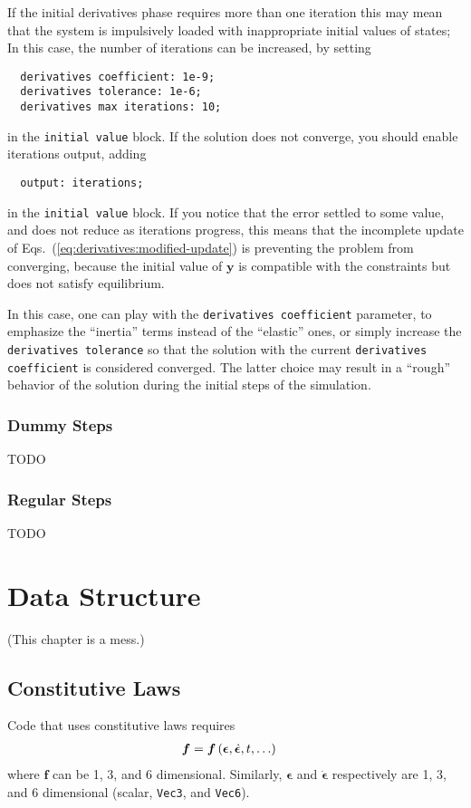 \documentclass[10pt,fleqn,subeqn]{report}
\newcommand{\T}[1]{\bm{#1}}
\begin{document}
If the initial derivatives phase requires
more than one iteration  
this may mean that
the system is impulsively loaded  with inappropriate 
initial values of states; 
In this case, the number of iterations can be increased,
by setting
\begin{verbatim}
  derivatives coefficient: 1e-9;
  derivatives tolerance: 1e-6;
  derivatives max iterations: 10; 
\end{verbatim}
in the \texttt{initial value} block.
If the solution does not converge, you should enable iterations output,
adding
\begin{verbatim}
  output: iterations;
\end{verbatim}
in the \texttt{initial value} block.
If you notice that the error settled to some value, and does not reduce
as iterations progress, this means that the incomplete update
of Eqs.~(\ref{eq:derivatives:modified-update})
is preventing the problem from converging, because the initial value
of $\T{y}$ is compatible with the constraints
but does not satisfy equilibrium.

In this case, one can play with the \texttt{derivatives coefficient}
parameter, to emphasize the ``inertia'' terms instead of the ``elastic'' ones,
or simply increase the \texttt{derivatives tolerance} so that the solution
with the current \texttt{derivatives coefficient} is considered converged.
The latter choice may result in a ``rough'' behavior of the solution
during the initial steps of the simulation.



\subsection{Dummy Steps}
TODO

\subsection{Regular Steps}
TODO






\chapter{Data Structure}
(This chapter is a mess.)


\section{Constitutive Laws}
Code that uses constitutive laws requires
\begin{align}
	\T{f}
	&=
	\T{f}\plbr{ \T{\epsilon}, \dot{\T{\epsilon}}, t, \ldots }
\end{align}
where $\T{f}$ can be 1, 3, and 6 dimensional.
Similarly, $\T{\epsilon}$ and $\dot{\T{\epsilon}}$
respectively are 1, 3, and 6 dimensional
(scalar, \texttt{Vec3}, and \texttt{Vec6}).
\end{document}
